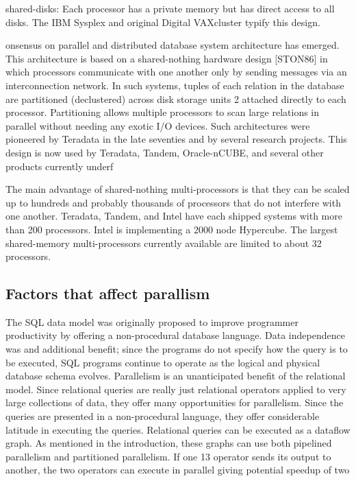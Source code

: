 \documentclass[10pt,twocolumn]{IEEEtran11}
\begin{document}
shared-disks: Each processor has a private memory but has direct access to all disks. The IBM
Sysplex and original Digital VAXcluster typify this design.



onsensus on parallel and distributed database system architecture has emerged. This
architecture is based on a shared-nothing hardware design [STON86] in which processors
communicate with one another only by sending messages via an interconnection network. In
such systems, tuples of each relation in the database are partitioned (declustered) across disk
storage units
2 attached directly to each processor. Partitioning allows multiple processors to scan
large relations in parallel without needing any exotic I/O devices. Such architectures were
pioneered by Teradata in the late seventies and by several research projects. This design is now
used by Teradata, Tandem, Oracle-nCUBE, and several other products currently underf


The main advantage of shared-nothing multi-processors is that they can be scaled up to
hundreds and probably thousands of processors that do not interfere with one another. Teradata,
Tandem, and Intel have each shipped systems with more than 200 processors. Intel is
implementing a 2000 node Hypercube. The largest shared-memory multi-processors currently
available are limited to about 32 processors.

\subsection{Factors that affect parallism}

The SQL data model was originally proposed to improve programmer productivity by
offering a non-procedural database language. Data independence was and additional benefit;
since the programs do not specify how the query is to be executed, SQL programs continue to
operate as the logical and physical database schema evolves.
Parallelism is an unanticipated benefit of the relational model. Since relational queries
are really just relational operators applied to very large collections of data, they offer many
opportunities for parallelism. Since the queries are presented in a non-procedural language, they
offer considerable latitude in executing the queries.
Relational queries can be executed as a dataflow graph. As mentioned in the
introduction, these graphs can use both pipelined parallelism and partitioned parallelism. If one
13
operator sends its output to another, the two operators can execute in parallel giving potential
speedup of two
\end{document}
